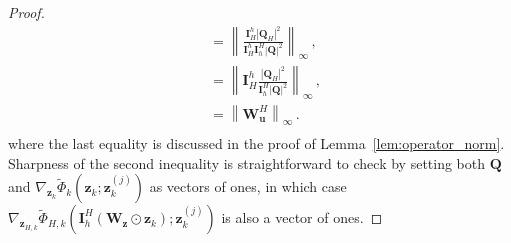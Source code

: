 \documentclass{article}
\numberwithin{equation}{section}
\begin{document}
\begin{proof}
\begin{equation*}
\begin{aligned}
        &= \left\|\frac{\bm{I}_H^h|\bm{Q}_H|^2}{\bm{I}_H^h\bm{I}_h^H|\bm{Q}|^2}\right\|_{\infty}\,,\\
        &= \left\|\bm{I}_H^h\frac{|\bm{Q}_H|^2}{\bm{I}_h^H|\bm{Q}|^2}\right\|_{\infty}\,,\\
        &= \left\|\bm{W}_{\bm{u}}^H\right\|_{\infty}\,.\\ 
    \end{aligned}
\end{equation*}
where the last equality is discussed in the proof of Lemma~\ref{lem:operator_norm}.  Sharpness of the second inequality is straightforward to check by setting both $\bm{Q}$ and $\nabla_{\bm{z}_{k}}\widetilde{\Phi}_k\left(\bm{z}_{k}; \bm{z}_k^{(j)}\right)$ as vectors of ones, in which case $\nabla_{\bm{z}_{H,k}}\widetilde{\Phi}_{H,k}\left(\bm{I}_h^H\left(\bm{W}_{\bm{z}}\odot\bm{z}_{k}\right); \bm{z}_k^{(j)}\right)$ is also a vector of ones.
\end{proof}
\end{document}
